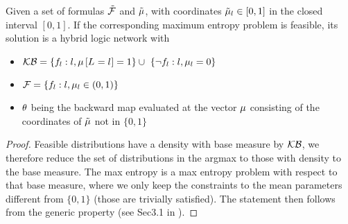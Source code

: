 \begin{theorem}
	Given a set of formulas $\tilde{\mathcal{F}}$ and $\tilde{\mu}$, with coordinates $\tilde{\mu}_l\in[0,1]$ in the closed interval $[0,1]$.
	If the corresponding maximum entropy problem is feasible, its solution is a hybrid logic network with 
	\begin{itemize}
		\item $\hardformulaset= \{\formula_\statenumerator : \statenumerator, \meanparamat{\indexedselvariable} = 1\} \cup  \{\lnot\formula_\statenumerator : \statenumerator, \meanparam_\statenumerator = 0\} $
		\item $\mathcal{F} = \{f_l : l, \mu_l \in (0,1)\}$
		\item $\theta$ being the backward map evaluated at the vector $\mu$ consisting of the coordinates of $\tilde{\mu}$ not in $\{0,1\}$
	\end{itemize}
\end{theorem}
\begin{proof}
	Feasible distributions have a density with base measure by $\mathcal{KB}$, we therefore reduce the set of distributions in the argmax to those with density to the base measure.
	The max entropy is a max entropy problem with respect to that base measure, where we only keep the constraints to the mean parameters different from $\{0,1\}$ (those are trivially satisfied).
	The statement then follows from the generic property (see Sec3.1 in \cite{wainwright_graphical_2008}).
\end{proof}















